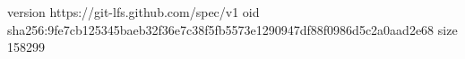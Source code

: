 version https://git-lfs.github.com/spec/v1
oid sha256:9fe7cb125345baeb32f36e7c38f5fb5573e1290947df88f0986d5c2a0aad2e68
size 158299
